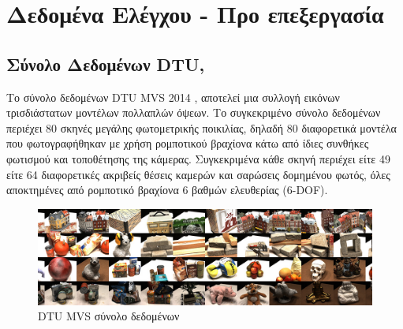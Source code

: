 \section{Δεδομένα Ελέγχου - Προ επεξεργασία}
\label{Dataset, Preprocessing}

\subsection{Σύνολο Δεδομένων DTU,  \cite{aanaes2016large}}
Το σύνολο δεδομένων DTU MVS 2014 \cite{aanaes2016large}, αποτελεί μια συλλογή εικόνων τρισδιάστατων μοντέλων πολλαπλών όψεων. Το συγκεκριμένο σύνολο δεδομένων περιέχει 80 σκηνές μεγάλης φωτομετρικής ποικιλίας, δηλαδή 80 διαφορετικά μοντέλα που φωτογραφήθηκαν με χρήση ρομποτικού βραχίονα κάτω από ίδιες συνθήκες φωτισμού και τοποθέτησης της κάμερας. Συγκεκριμένα κάθε σκηνή περιέχει είτε 49 είτε 64 διαφορετικές ακριβείς θέσεις καμερών και σαρώσεις δομημένου φωτός, όλες αποκτημένες από ρομποτικό βραχίονα 6 βαθμών ελευθερίας (6-DOF).

\begin{figure}
    \centering
    \includegraphics[width=\linewidth]{images/chapter4_img/dtu.jpg}
    \caption{DTU MVS σύνολο δεδομένων}
    \label{fig:dtu}
\end{figure}

